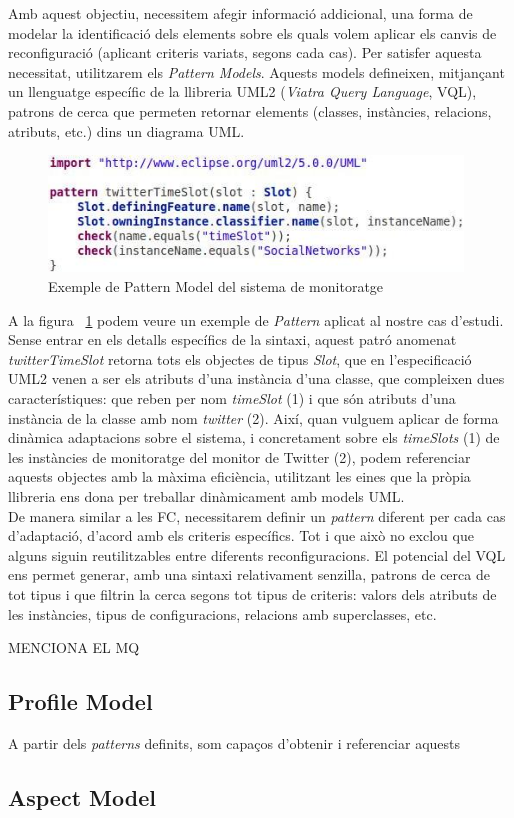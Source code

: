 Amb aquest objectiu, necessitem afegir informació addicional, una forma de modelar la identificació dels elements sobre els quals volem aplicar els canvis de reconfiguració (aplicant criteris variats, segons cada cas). Per satisfer aquesta necessitat, utilitzarem els \textit{Pattern Models}. Aquests models defineixen, mitjançant un llenguatge específic de la llibreria UML2 (\textit{Viatra Query Language}, VQL), patrons de cerca que permeten retornar elements (classes, instàncies, relacions, atributs, etc.) dins un diagrama UML.\\ 

\begin{figure}
\centering
\includegraphics[width=11cm]{Figures/Figure19}
\decoRule
\caption{Exemple de Pattern Model del sistema de monitoratge}
\label{fig:Figura19}
\end{figure}

A la figura ~\ref{fig:Figura19} podem veure un exemple de \textit{Pattern} aplicat al nostre cas d'estudi. Sense entrar en els detalls específics de la sintaxi, aquest patró anomenat \textit{twitterTimeSlot} retorna tots els objectes de tipus \textit{Slot}, que en l'especificació UML2 venen a ser els atributs d'una instància d'una classe, que compleixen dues característiques: que reben per nom \textit{timeSlot} (1) i que són atributs d'una instància de la classe amb nom \textit{twitter} (2). Així, quan vulguem aplicar de forma dinàmica adaptacions sobre el sistema, i concretament sobre els \textit{timeSlots} (1) de les instàncies de monitoratge del monitor de Twitter (2), podem referenciar aquests objectes amb la màxima eficiència, utilitzant les eines que la pròpia llibreria ens dona per treballar dinàmicament amb models UML.\\

De manera similar a les FC, necessitarem definir un \textit{pattern} diferent per cada cas d'adaptació, d'acord amb els criteris específics. Tot i que això no exclou que alguns siguin reutilitzables entre diferents reconfiguracions. El potencial del VQL ens permet generar, amb una sintaxi relativament senzilla, patrons de cerca de tot tipus i que filtrin la cerca segons tot tipus de criteris: valors dels atributs de les instàncies, tipus de configuracions, relacions amb superclasses, etc. 

MENCIONA EL MQ

\subsection{Profile Model}

A partir dels \textit{patterns} definits, som capaços d'obtenir i referenciar aquests  

\subsection{Aspect Model}

